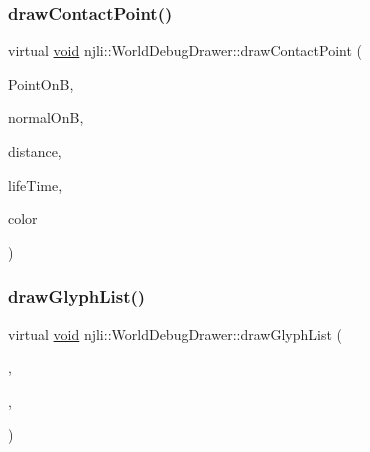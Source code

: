 \mbox{\label{classnjli_1_1_world_debug_drawer_a5469fad4a1de098b62a2e9ecc3bcc291}} 
\subsubsection{\texorpdfstring{draw\+Contact\+Point()}{drawContactPoint()}}
{\footnotesize\ttfamily virtual \mbox{\hyperlink{_thread_8h_af1e856da2e658414cb2456cb6f7ebc66}{void}} njli\+::\+World\+Debug\+Drawer\+::draw\+Contact\+Point (\begin{DoxyParamCaption}\item[{const bt\+Vector3 \&}]{Point\+OnB,  }\item[{const bt\+Vector3 \&}]{normal\+OnB,  }\item[{bt\+Scalar}]{distance,  }\item[{int}]{life\+Time,  }\item[{const bt\+Vector3 \&}]{color }\end{DoxyParamCaption})\hspace{0.3cm}{\ttfamily [virtual]}}

\mbox{\label{classnjli_1_1_world_debug_drawer_a902a5a10ef3b87d602cd87e2cd37c3e4}} 
\subsubsection{\texorpdfstring{draw\+Glyph\+List()}{drawGlyphList()}}
{\footnotesize\ttfamily virtual \mbox{\hyperlink{_thread_8h_af1e856da2e658414cb2456cb6f7ebc66}{void}} njli\+::\+World\+Debug\+Drawer\+::draw\+Glyph\+List (\begin{DoxyParamCaption}\item[{const dd\+::\+Draw\+Vertex $\ast$}]{,  }\item[{int}]{,  }\item[{dd\+::\+Glyph\+Texture\+Handle}]{ }\end{DoxyParamCaption})\hspace{0.3cm}{\ttfamily [virtual]}}

